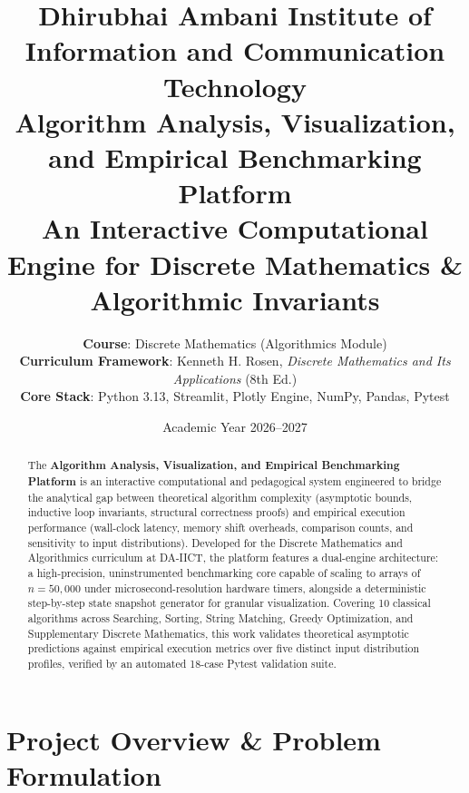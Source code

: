 \documentclass[11pt,a4paper]{article}
\title{
    \vspace{-1.5cm}
    \textbf{\Large Dhirubhai Ambani Institute of Information and Communication Technology}\\
    \vspace{0.3cm}
    \textbf{\LARGE Algorithm Analysis, Visualization, and Empirical Benchmarking Platform}\\
    \vspace{0.2cm}
    \large An Interactive Computational Engine for Discrete Mathematics \& Algorithmic Invariants
}
\author{
    \textbf{Course}: Discrete Mathematics (Algorithmics Module) \\
    \textbf{Curriculum Framework}: Kenneth H. Rosen, \textit{Discrete Mathematics and Its Applications} (8th Ed.) \\
    \textbf{Core Stack}: Python 3.13, Streamlit, Plotly Engine, NumPy, Pandas, Pytest
}
\date{Academic Year 2026--2027}
\theoremstyle{definition}
\theoremstyle{plain}
\theoremstyle{remark}
\begin{document}

\maketitle
\thispagestyle{fancy}

\begin{abstract}
The \textbf{Algorithm Analysis, Visualization, and Empirical Benchmarking Platform} is an interactive computational and pedagogical system engineered to bridge the analytical gap between theoretical algorithm complexity (asymptotic bounds, inductive loop invariants, structural correctness proofs) and empirical execution performance (wall-clock latency, memory shift overheads, comparison counts, and sensitivity to input distributions). Developed for the Discrete Mathematics and Algorithmics curriculum at DA-IICT, the platform features a dual-engine architecture: a high-precision, uninstrumented benchmarking core capable of scaling to arrays of $n = 50{,}000$ under microsecond-resolution hardware timers, alongside a deterministic step-by-step state snapshot generator for granular visualization. Covering 10 classical algorithms across Searching, Sorting, String Matching, Greedy Optimization, and Supplementary Discrete Mathematics, this work validates theoretical asymptotic predictions against empirical execution metrics over five distinct input distribution profiles, verified by an automated 18-case Pytest validation suite.
\end{abstract}

\vspace{0.5cm}
\tableofcontents
\newpage

\section{Project Overview \& Problem Formulation}
\end{document}

